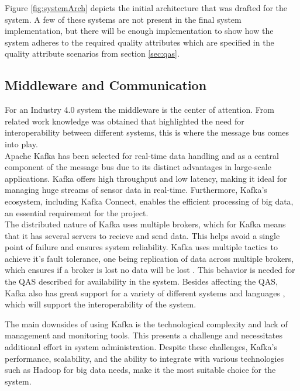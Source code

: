 Figure \ref{fig:systemArch} depicts the initial architecture that was drafted for the system. A few of these systems are not present in the final system implementation, but there will be enough implementation to show how the system adheres to the required quality attributes which are specified in the quality attribute scenarios from section \ref{sec:qas}.
\subsection{\textbf{Middleware and Communication}}
For an Industry 4.0 system the middleware is the center of attention. From related work knowledge was obtained that highlighted the need for interoperability between different systems, this is where the message bus comes into play. \vspace{2mm} \\
Apache Kafka \cite{Apache2022Connect} has been selected for real-time data handling and as a central component of the message bus due to its distinct advantages in large-scale applications. Kafka offers high throughput and low latency, making it ideal for managing huge streams of sensor data in real-time. Furthermore, Kafka's ecosystem, including Kafka Connect, enables the efficient processing of big data, an essential requirement for the project. \vspace{2mm} \\

The distributed nature of Kafka uses multiple brokers, which for Kafka means that it has several servers to recieve and send data. This helps avoid a single point of failure and ensures system reliability. Kafka uses multiple tactics to achieve it's fault tolerance, one being replication of data across multiple brokers, which ensures if a broker is lost no data will be lost \cite{AltexSoft_2022}. This behavior is needed for the QAS described for availability in the system.
Besides affecting the QAS, Kafka also has great support for a variety of different systems and languages \cite{AltexSoft_2022}, which will support the interoperability of the system. \vspace{2mm}

The main downsides of using Kafka is the technological complexity and lack of management and monitoring tools. This presents a challenge and necessitates additional effort in system administration. Despite these challenges, Kafka's performance, scalability, and the ability to integrate with various technologies such as Hadoop for big data needs, make it the most suitable choice for the system. \vspace{2mm}


